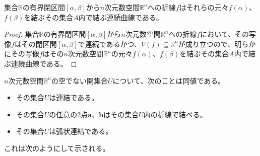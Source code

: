 \documentclass[dvipdfmx]{jsarticle}
\begin{document}
\begin{thm}\label{4.1.12.12}
集合$\mathbb{R}$の有界閉区間$[\alpha,\beta]$から$n$次元数空間$\mathbb{R}^{n}$への折線$f$はそれらの元々$f(\alpha)$、$f(\beta)$を結ぶその集合$A$内で結ぶ連続曲線である。
\end{thm}
\begin{proof}
集合$\mathbb{R}$の有界閉区間$[\alpha,\beta]$から$n$次元数空間$\mathbb{R}^{n}$への折線$f$において、その写像$f$はその閉区間$[\alpha,\beta]$で連続であるかつ、$V(f) \subseteq \mathbb{R}^{n}$が成り立つので、明らかにその写像$f$はその$n$次元数空間$\mathbb{R}^{n}$の元々$f(\alpha)$、$f(\beta)$を結ぶその集合$A$内で結ぶ連続曲線である。
\end{proof}
\begin{thm}\label{4.1.12.13}
$n$次元数空間$\mathbb{R}^{n}$の空でない開集合$U$について、次のことは同値である。
\begin{itemize}
\item
  その集合$U$は連結である。
\item
  その集合$U$の任意の2点$\mathbf{a}$、$\mathbf{b}$はその集合$U$内の折線で結べる。
\item
  その集合$U$は弧状連結である。
\end{itemize}
\end{thm}\par
これは次のようにして示される。
\end{document}
